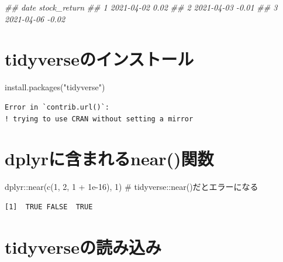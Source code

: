 \documentclass[
  letterpaper,
  DIV=11,
  numbers=noendperiod]{scrreprt}
\newenvironment{Shaded}{\begin{snugshade}}{\end{snugshade}}
\newcommand{\CommentTok}[1]{\textcolor[rgb]{0.37,0.37,0.37}{#1}}
\newcommand{\DecValTok}[1]{\textcolor[rgb]{0.68,0.00,0.00}{#1}}
\newcommand{\DocumentationTok}[1]{\textcolor[rgb]{0.37,0.37,0.37}{\textit{#1}}}
\newcommand{\FloatTok}[1]{\textcolor[rgb]{0.68,0.00,0.00}{#1}}
\newcommand{\FunctionTok}[1]{\textcolor[rgb]{0.28,0.35,0.67}{#1}}
\newcommand{\NormalTok}[1]{\textcolor[rgb]{0.00,0.23,0.31}{#1}}
\newcommand{\SpecialCharTok}[1]{\textcolor[rgb]{0.37,0.37,0.37}{#1}}
\newcommand{\StringTok}[1]{\textcolor[rgb]{0.13,0.47,0.30}{#1}}
\begin{document}
\begin{Shaded}
\begin{Highlighting}[]
\DocumentationTok{\#\#         date stock\_return}
\DocumentationTok{\#\# 1 2021{-}04{-}02         0.02}
\DocumentationTok{\#\# 2 2021{-}04{-}03        {-}0.01}
\DocumentationTok{\#\# 3 2021{-}04{-}06        {-}0.02 }
\end{Highlighting}
\end{Shaded}

\section{tidyverseのインストール}\label{tidyverseux306eux30a4ux30f3ux30b9ux30c8ux30fcux30eb}

\begin{Shaded}
\begin{Highlighting}[]
\FunctionTok{install.packages}\NormalTok{(}\StringTok{"tidyverse"}\NormalTok{)}
\end{Highlighting}
\end{Shaded}

\begin{verbatim}
Error in `contrib.url()`:
! trying to use CRAN without setting a mirror
\end{verbatim}

\section{dplyrに含まれるnear()関数}\label{dplyrux306bux542bux307eux308cux308bnearux95a2ux6570}

\begin{Shaded}
\begin{Highlighting}[]
\NormalTok{dplyr}\SpecialCharTok{::}\FunctionTok{near}\NormalTok{(}\FunctionTok{c}\NormalTok{(}\DecValTok{1}\NormalTok{, }\DecValTok{2}\NormalTok{, }\DecValTok{1} \SpecialCharTok{+} \FloatTok{1e{-}16}\NormalTok{), }\DecValTok{1}\NormalTok{) }\CommentTok{\# tidyverse::near()だとエラーになる}
\end{Highlighting}
\end{Shaded}

\begin{verbatim}
[1]  TRUE FALSE  TRUE
\end{verbatim}

\section{tidyverseの読み込み}\label{tidyverseux306eux8aadux307fux8fbcux307f}
\end{document}
